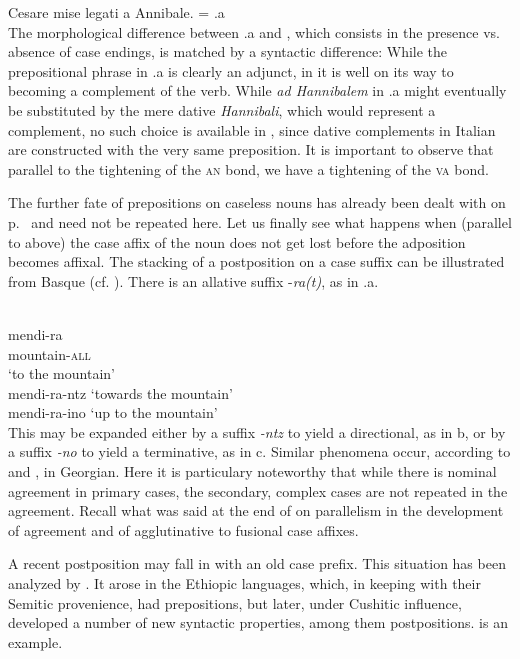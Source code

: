 \ea\label{ex:E73}
    Cesare mise legati a Annibale.  = .a\\
\z
\noindent The morphological difference between .a and , which consists in the presence vs. absence of case endings, is matched by a syntactic difference: While the prepositional phrase in .a is clearly an adjunct, in  it is well on its way to becoming a complement of the verb.\label{page100} While \textit{ad Hannibalem} in .a might eventually be substituted by the mere dative \textit{Hannibali}, which would represent a complement, no such choice is available in , since dative complements in Italian are constructed with the very same preposition. It is important to observe that parallel to the tightening of the \textsc{an} bond, we have a tightening of the \textsc{va} bond.

The further fate of prepositions on caseless nouns has already been dealt with on p.~\pageref{page88}\chk%
and need not be repeated here. Let us finally see what happens when (parallel to  above) the case affix of the noun does not get lost before the adposition becomes affixal. The stacking of a postposition on a case suffix can be illustrated from Basque (cf. \citet[69]{Brettschneider1978}). There is an allative suffix -\textit{ra(t)}, as in .a.

\ea\label{ex:E74}
 \\
\ea
\gll mendi-ra\\
mountain-\textsc{all} \\
\glt ‘to the mountain’\\
\ex  mendi-ra-ntz 
\glt ‘towards the mountain’\\
\ex  mendi-ra-ino 
\glt ‘up to the mountain’\\
\z
\z
\noindent This may be expanded either by a suffix \textit{{}-ntz} to yield a directional, as in b, or by a suffix \textit{{}-no} to yield a terminative, as in c. Similar phenomena occur, according to \citet[123f]{Kahr1976} and \citet[210f]{Comrie1981a},\label{page101} in Georgian. Here it is particulary noteworthy that while there is nominal agreement in primary cases, the secondary, complex cases are not repeated in the agreement. Recall what was said at the end of  on parallelism in the development of agreement and of agglutinative to fusional case affixes.

A recent postposition may fall in with an old case prefix. This situation has been analyzed by \citet{Greenberg1980}. It arose in the Ethiopic languages, which, in keeping with their Semitic provenience, had prepositions, but later, under Cushitic influence, developed a number of new syntactic properties, among them postpositions.  is an example.


